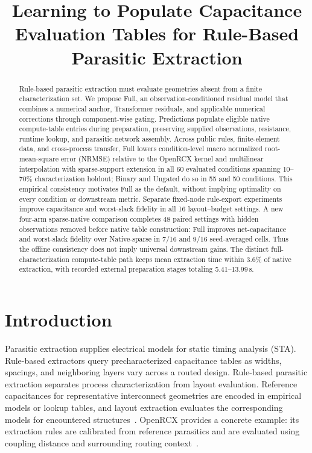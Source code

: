 \documentclass[conference,9pt,letterpaper]{IEEEtran}
\title{Learning to Populate Capacitance Evaluation Tables for Rule-Based Parasitic Extraction}
\author{\IEEEauthorblockN{Anonymous authors}\IEEEauthorblockA{\vphantom{Department and affiliation}\vphantom{City, Country}\\\vphantom{Contact information}}}
\begin{document}
\maketitle
\begin{abstract}
Rule-based parasitic extraction must evaluate geometries absent from a finite characterization set. We propose Full, an observation-conditioned residual model that combines a numerical anchor, Transformer residuals, and applicable numerical corrections through component-wise gating. Predictions populate eligible native compute-table entries during preparation, preserving supplied observations, resistance, runtime lookup, and parasitic-network assembly. Across public rules, finite-element data, and cross-process transfer, Full lowers condition-level macro normalized root-mean-square error (NRMSE) relative to the OpenRCX kernel and multilinear interpolation with sparse-support extension in all 60 evaluated conditions spanning 10--70\% characterization holdout; Binary and Ungated do so in 55 and 50 conditions. This empirical consistency motivates Full as the default, without implying optimality on every condition or downstream metric. Separate fixed-node rule-export experiments improve capacitance and worst-slack fidelity in all 16 layout--budget settings. A new four-arm sparse-native comparison completes 48 paired settings with hidden observations removed before native table construction: Full improves net-capacitance and worst-slack fidelity over Native-sparse in 7/16 and 9/16 seed-averaged cells. Thus the offline consistency does not imply universal downstream gains. The distinct full-characterization compute-table path keeps mean extraction time within 3.6\% of native extraction, with recorded external preparation stages totaling 5.41--13.99\,s.
\end{abstract}

\section{Introduction}
Parasitic extraction supplies electrical models for static
timing analysis (STA). Rule-based extractors query precharacterized capacitance tables as widths, spacings, and neighboring layers vary across a routed design.
Rule-based parasitic extraction separates process characterization from layout evaluation. Reference capacitances for representative interconnect geometries are encoded in empirical models or lookup tables, and layout extraction evaluates the corresponding models for encountered structures~\cite{tsai,yang2023cnncap}. OpenRCX provides a concrete example: its extraction rules are calibrated from reference parasitics and are evaluated using coupling distance and surrounding routing context~\cite{orcx_runtime,openrcx}.
\end{document}
